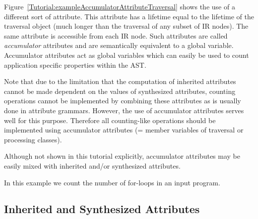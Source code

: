    Figure~\ref{Tutorial:exampleAccumulatorAttributeTraversal} shows the use of
a different sort of attribute.  This attribute has a lifetime equal to the
lifetime of the traversal object (much longer than the traversal of any subset 
of IR nodes).  The same attribute is accessible from each IR node.  Such 
attributes are called {\em accumulator} attributes and are semantically 
equivalent to a global variable. Accumulator attributes
act as global variables which can easily be used to count application 
specific properties within the AST. 

Note that due to the limitation that the computation of inherited attributes cannot be made dependent on the values of synthesized attributes, counting operations cannot be implemented by combining these attributes as is usually done in attribute grammars. However, the use of accumulator attributes serves well for this purpose. Therefore all counting-like operations should be implemented using accumulator attributes (= member variables of traversal or processing classes).

     Although not shown in this tutorial explicitly, accumulator attributes
may be easily mixed with inherited and/or synthesized attributes.

In this example we count the number of for-loops in an input program.







\subsection{Inherited and Synthesized Attributes}

